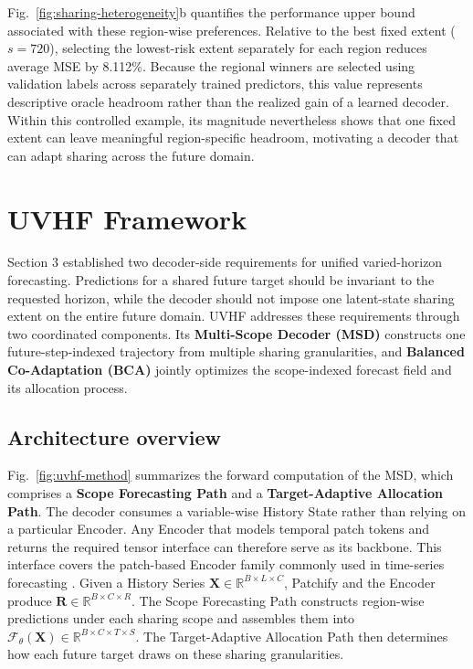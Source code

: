 \documentclass[final,3p,times]{elsarticle}
\newif\ifshowrevisions
\newcommand{\rev}[1]{\ifshowrevisions\textcolor{revisionblue}{#1}\else#1\fi}
\begin{document}
Fig.~\ref{fig:sharing-heterogeneity}b quantifies the performance upper bound associated with these region-wise preferences. Relative to the best fixed extent ($s=720$), selecting the lowest-risk extent separately for each region reduces average MSE by 8.112\%. Because the regional winners are selected using validation labels across separately trained predictors, this value represents descriptive oracle headroom rather than the realized gain of a learned decoder. Within this controlled example, its magnitude nevertheless shows that one fixed extent can leave meaningful region-specific headroom, motivating a decoder that can adapt sharing across the future domain.

\section{\rev{UVHF Framework}}
\label{sec:method}


Section 3 established two decoder-side requirements for \rev{unified varied-horizon forecasting}. Predictions for a shared future target should be invariant to the requested horizon, while the decoder should not impose one latent-state sharing extent on the entire future domain. \rev{UVHF addresses these requirements through two coordinated components. Its \textbf{Multi-Scope Decoder (MSD)} constructs one future-step-indexed trajectory from multiple sharing granularities, and \textbf{Balanced Co-Adaptation (BCA)} jointly optimizes the scope-indexed forecast field and its allocation process.}

\subsection{Architecture overview}


Fig.~\ref{fig:uvhf-method} summarizes the forward computation of \rev{the MSD}, which comprises a \textbf{Scope Forecasting Path} and a \textbf{Target-Adaptive Allocation Path}. The decoder consumes a variable-wise History State rather than relying on a particular Encoder. Any Encoder that models temporal patch tokens and returns the required tensor interface can therefore serve as its backbone. This interface covers the patch-based Encoder family commonly used in time-series forecasting \citep{nie2023patchtst,zhang2023crossformer}. Given a History Series $\mathbf X\in\mathbb R^{B\times L\times C}$, Patchify and the Encoder produce $\mathbf R\in\mathbb R^{B\times C\times R}$. The Scope Forecasting Path constructs region-wise predictions under each sharing scope and assembles them into $\mathcal F_\theta(\mathbf X)\in\mathbb R^{B\times C\times T\times S}$. The Target-Adaptive Allocation Path then determines how each future target draws on these sharing granularities.
\end{document}

